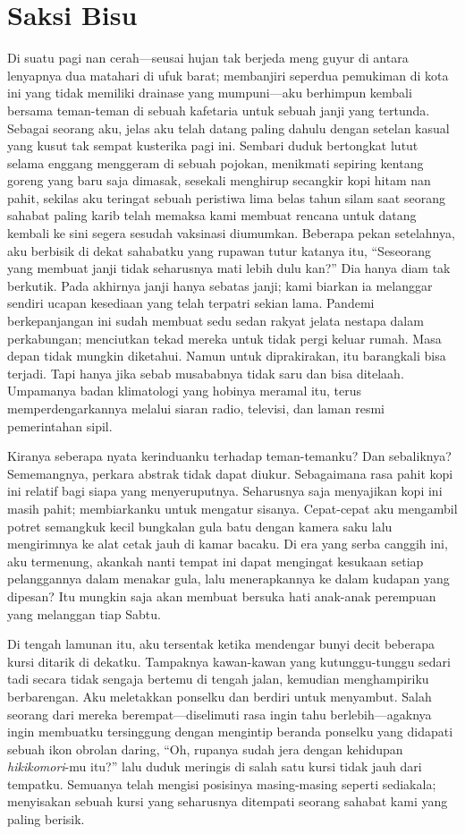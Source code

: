 \documentclass[smalldemyvopaper,11pt,twoside,onecolumn,openright,extrafontsizes]{memoir}
\begin{document}
\chapter{Saksi Bisu}

Di suatu pagi nan cerah---seusai hujan tak berjeda meng guyur di antara lenyapnya dua matahari di ufuk barat; membanjiri seperdua pemukiman di kota ini yang tidak memiliki drainase yang mumpuni---aku berhimpun kembali bersama teman-teman di sebuah kafetaria untuk sebuah janji yang tertunda. Sebagai seorang aku, jelas aku telah datang paling dahulu dengan setelan kasual yang kusut tak sempat kusterika pagi ini. Sembari duduk bertongkat lutut selama enggang menggeram di sebuah pojokan, menikmati sepiring kentang goreng yang baru saja dimasak, sesekali menghirup secangkir kopi hitam nan pahit, sekilas aku teringat sebuah peristiwa lima belas tahun silam saat seorang sahabat paling karib telah memaksa kami membuat rencana untuk datang kembali ke sini segera sesudah vaksinasi diumumkan. Beberapa pekan setelahnya, aku berbisik di dekat sahabatku yang rupawan tutur katanya itu, ``Seseorang yang membuat janji tidak seharusnya mati lebih dulu kan?'' Dia hanya diam tak berkutik. Pada akhirnya janji hanya sebatas janji; kami biarkan ia melanggar sendiri ucapan kesediaan yang telah terpatri sekian lama. Pandemi berkepanjangan ini sudah membuat sedu sedan rakyat jelata nestapa dalam perkabungan; menciutkan tekad mereka untuk tidak pergi keluar rumah. Masa depan tidak mungkin diketahui. Namun untuk diprakirakan, itu barangkali bisa terjadi. Tapi hanya jika sebab musababnya tidak saru dan bisa ditelaah. Umpamanya badan klimatologi yang hobinya meramal itu, terus memperdengarkannya melalui siaran radio, televisi, dan laman resmi pemerintahan sipil.

Kiranya seberapa nyata kerinduanku terhadap teman-temanku? Dan sebaliknya? Sememangnya, perkara abstrak tidak dapat diukur. Sebagaimana rasa pahit kopi ini relatif bagi siapa yang menyeruputnya. Seharusnya saja menyajikan kopi ini masih pahit; membiarkanku untuk mengatur sisanya. Cepat-cepat aku mengambil potret semangkuk kecil bungkalan gula batu dengan kamera saku lalu mengirimnya ke alat cetak jauh di kamar bacaku. Di era yang serba canggih ini, aku termenung, akankah nanti tempat ini dapat mengingat kesukaan setiap pelanggannya dalam menakar gula, lalu menerapkannya ke dalam kudapan yang dipesan? Itu mungkin saja akan membuat bersuka hati anak-anak perempuan yang melanggan tiap Sabtu.

Di tengah lamunan itu, aku tersentak ketika mendengar bunyi decit beberapa kursi ditarik di dekatku. Tampaknya kawan-kawan yang kutunggu-tunggu sedari tadi secara tidak sengaja bertemu di tengah jalan, kemudian menghampiriku berbarengan. Aku meletakkan ponselku dan berdiri untuk menyambut. Salah seorang dari mereka berempat---diselimuti rasa ingin tahu berlebih---agaknya ingin membuatku tersinggung dengan mengintip beranda ponselku yang didapati sebuah ikon obrolan daring, ``Oh, rupanya sudah jera dengan kehidupan \textit{hikikomori}-mu itu?'' lalu duduk meringis di salah satu kursi tidak jauh dari tempatku. Semuanya telah mengisi posisinya masing-masing seperti sediakala; menyisakan sebuah kursi yang seharusnya ditempati seorang sahabat kami yang paling berisik.
\end{document}
